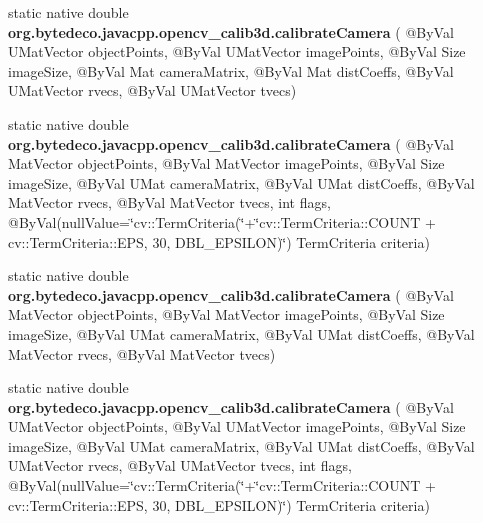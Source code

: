 \begin{DoxyCompactItemize}
\mbox{\label{group__calib3d_gab5136f6fe18f60884ed2680caddf7a35}} 
static native double {\bfseries org.\+bytedeco.\+javacpp.\+opencv\+\_\+calib3d.\+calibrate\+Camera} ( @By\+Val U\+Mat\+Vector object\+Points, @By\+Val U\+Mat\+Vector image\+Points, @By\+Val Size image\+Size, @By\+Val Mat camera\+Matrix, @By\+Val Mat dist\+Coeffs, @By\+Val U\+Mat\+Vector rvecs, @By\+Val U\+Mat\+Vector tvecs)
\item 
\mbox{\label{group__calib3d_ga411e043c491e285a3b70d71b13632934}} 
static native double {\bfseries org.\+bytedeco.\+javacpp.\+opencv\+\_\+calib3d.\+calibrate\+Camera} ( @By\+Val Mat\+Vector object\+Points, @By\+Val Mat\+Vector image\+Points, @By\+Val Size image\+Size, @By\+Val U\+Mat camera\+Matrix, @By\+Val U\+Mat dist\+Coeffs, @By\+Val Mat\+Vector rvecs, @By\+Val Mat\+Vector tvecs, int flags, @By\+Val(null\+Value=\char`\"{}cv\+::\+Term\+Criteria(\char`\"{}+\char`\"{}cv\+::\+Term\+Criteria\+::\+C\+O\+U\+NT + cv\+::\+Term\+Criteria\+::\+E\+PS, 30, D\+B\+L\+\_\+\+E\+P\+S\+I\+L\+ON)\char`\"{}) Term\+Criteria criteria)
\item 
\mbox{\label{group__calib3d_ga31c82e0aef7edf2e6c771d09aec0d9ec}} 
static native double {\bfseries org.\+bytedeco.\+javacpp.\+opencv\+\_\+calib3d.\+calibrate\+Camera} ( @By\+Val Mat\+Vector object\+Points, @By\+Val Mat\+Vector image\+Points, @By\+Val Size image\+Size, @By\+Val U\+Mat camera\+Matrix, @By\+Val U\+Mat dist\+Coeffs, @By\+Val Mat\+Vector rvecs, @By\+Val Mat\+Vector tvecs)
\item 
\mbox{\label{group__calib3d_ga22f03dba033867707b518752c69be16d}} 
static native double {\bfseries org.\+bytedeco.\+javacpp.\+opencv\+\_\+calib3d.\+calibrate\+Camera} ( @By\+Val U\+Mat\+Vector object\+Points, @By\+Val U\+Mat\+Vector image\+Points, @By\+Val Size image\+Size, @By\+Val U\+Mat camera\+Matrix, @By\+Val U\+Mat dist\+Coeffs, @By\+Val U\+Mat\+Vector rvecs, @By\+Val U\+Mat\+Vector tvecs, int flags, @By\+Val(null\+Value=\char`\"{}cv\+::\+Term\+Criteria(\char`\"{}+\char`\"{}cv\+::\+Term\+Criteria\+::\+C\+O\+U\+NT + cv\+::\+Term\+Criteria\+::\+E\+PS, 30, D\+B\+L\+\_\+\+E\+P\+S\+I\+L\+ON)\char`\"{}) Term\+Criteria criteria)
\item 
\mbox{\label{group__calib3d_ga6266413ca692ed2780519fa3dcc880da}} 

\end{DoxyCompactItemize}
